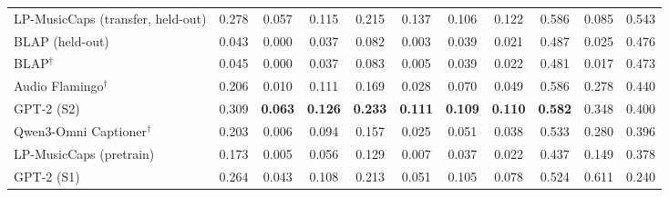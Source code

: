 \begin{table}[t]
\begin{tabular}{lcccccccccc}
LP-MusicCaps (transfer, held-out) & 0.278 & 0.057 & 0.115 & 0.215 & 0.137 & 0.106 & 0.122 & 0.586 & 0.085 & 0.543 \\
BLAP (held-out) & 0.043 & 0.000 & 0.037 & 0.082 & 0.003 & 0.039 & 0.021 & 0.487 & 0.025 & 0.476 \\
BLAP$^{\dagger}$ & 0.045 & 0.000 & 0.037 & 0.083 & 0.005 & 0.039 & 0.022 & 0.481 & 0.017 & 0.473 \\
Audio Flamingo$^{\dagger}$ & 0.206 & 0.010 & 0.111 & 0.169 & 0.028 & 0.070 & 0.049 & 0.586 & 0.278 & 0.440 \\
GPT-2 (S2) & 0.309 & \textbf{0.063} & \textbf{0.126} & \textbf{0.233} & \textbf{0.111} & \textbf{0.109} & \textbf{0.110} & \textbf{0.582} & 0.348 & 0.400 \\
Qwen3-Omni Captioner$^{\dagger}$ & 0.203 & 0.006 & 0.094 & 0.157 & 0.025 & 0.051 & 0.038 & 0.533 & 0.280 & 0.396 \\
LP-MusicCaps (pretrain) & 0.173 & 0.005 & 0.056 & 0.129 & 0.007 & 0.037 & 0.022 & 0.437 & 0.149 & 0.378 \\
GPT-2 (S1) & 0.264 & 0.043 & 0.108 & 0.213 & 0.051 & 0.105 & 0.078 & 0.524 & 0.611 & 0.240 \\
\bottomrule
\end{tabular}
\end{table}
